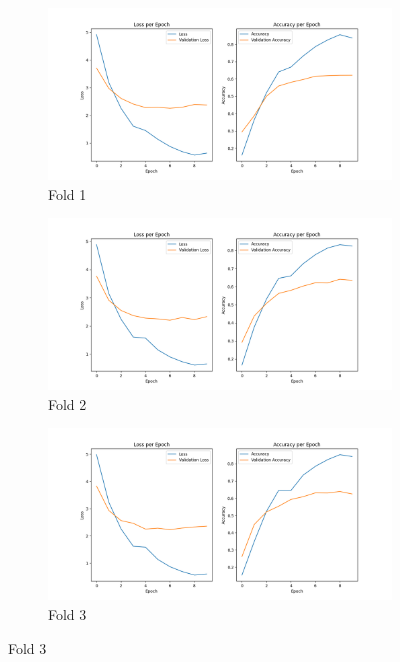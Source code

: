 \documentclass[10pt,english,a4paper]{report}
\begin{document}
\begin{figure}[!ht]
    \centering
    \begin{subfigure}[b]{0.4\textwidth}
        \includegraphics[width=\textwidth]{figures/training/learning_curve_fold_1.png}
        \caption{Fold 1}
        \label{fig:plot1}
    \end{subfigure}
    \hfill
    \begin{subfigure}[b]{0.4\textwidth}
        \includegraphics[width=\textwidth]{figures/training/learning_curve_fold_2.png}
        \caption{Fold 2}
        \label{fig:plot2}
    \end{subfigure}
    \hfill
    \begin{subfigure}[b]{0.4\textwidth}
        \includegraphics[width=\textwidth]{figures/training/learning_curve_fold_3.png}
        \caption{Fold 3}
        \label{fig:plot3}
    \end{subfigure}
    

\end{figure}
\end{document}
